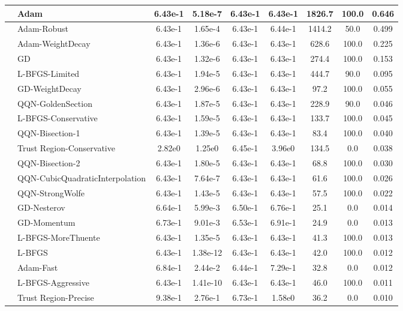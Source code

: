 \documentclass[10pt]{article}
\begin{document}
\begin{longtable}{|l|l|c|c|c|c|c|c|c|}
\hline
 & Adam & 6.43e-1 & 5.18e-7 & 6.43e-1 & 6.43e-1 & 1826.7 & 100.0 & 0.646 \\
\hline
 & Adam-Robust & 6.43e-1 & 1.65e-4 & 6.43e-1 & 6.44e-1 & 1414.2 & 50.0 & 0.499 \\
\hline
 & Adam-WeightDecay & 6.43e-1 & 1.36e-6 & 6.43e-1 & 6.43e-1 & 628.6 & 100.0 & 0.225 \\
\hline
 & GD & 6.43e-1 & 1.32e-6 & 6.43e-1 & 6.43e-1 & 274.4 & 100.0 & 0.153 \\
\hline
 & L-BFGS-Limited & 6.43e-1 & 1.94e-5 & 6.43e-1 & 6.43e-1 & 444.7 & 90.0 & 0.095 \\
\hline
 & GD-WeightDecay & 6.43e-1 & 2.96e-6 & 6.43e-1 & 6.43e-1 & 97.2 & 100.0 & 0.055 \\
\hline
 & QQN-GoldenSection & 6.43e-1 & 1.87e-5 & 6.43e-1 & 6.43e-1 & 228.9 & 90.0 & 0.046 \\
\hline
 & L-BFGS-Conservative & 6.43e-1 & 1.59e-5 & 6.43e-1 & 6.43e-1 & 133.7 & 100.0 & 0.045 \\
\hline
 & QQN-Bisection-1 & 6.43e-1 & 1.39e-5 & 6.43e-1 & 6.43e-1 & 83.4 & 100.0 & 0.040 \\
\hline
 & Trust Region-Conservative & 2.82e0 & 1.25e0 & 6.45e-1 & 3.96e0 & 134.5 & 0.0 & 0.038 \\
\hline
 & QQN-Bisection-2 & 6.43e-1 & 1.80e-5 & 6.43e-1 & 6.43e-1 & 68.8 & 100.0 & 0.030 \\
\hline
 & QQN-CubicQuadraticInterpolation & 6.43e-1 & 7.64e-7 & 6.43e-1 & 6.43e-1 & 61.6 & 100.0 & 0.026 \\
\hline
 & QQN-StrongWolfe & 6.43e-1 & 1.43e-5 & 6.43e-1 & 6.43e-1 & 57.5 & 100.0 & 0.022 \\
\hline
 & GD-Nesterov & 6.64e-1 & 5.99e-3 & 6.50e-1 & 6.76e-1 & 25.1 & 0.0 & 0.014 \\
\hline
 & GD-Momentum & 6.73e-1 & 9.01e-3 & 6.53e-1 & 6.91e-1 & 24.9 & 0.0 & 0.013 \\
\hline
 & L-BFGS-MoreThuente & 6.43e-1 & 1.35e-5 & 6.43e-1 & 6.43e-1 & 41.3 & 100.0 & 0.013 \\
\hline
 & L-BFGS & 6.43e-1 & 1.38e-12 & 6.43e-1 & 6.43e-1 & 42.0 & 100.0 & 0.012 \\
\hline
 & Adam-Fast & 6.84e-1 & 2.44e-2 & 6.44e-1 & 7.29e-1 & 32.8 & 0.0 & 0.012 \\
\hline
 & L-BFGS-Aggressive & 6.43e-1 & 1.41e-10 & 6.43e-1 & 6.43e-1 & 46.0 & 100.0 & 0.011 \\
\hline
 & Trust Region-Precise & 9.38e-1 & 2.76e-1 & 6.73e-1 & 1.58e0 & 36.2 & 0.0 & 0.010 \\

\end{longtable}
\end{document}
